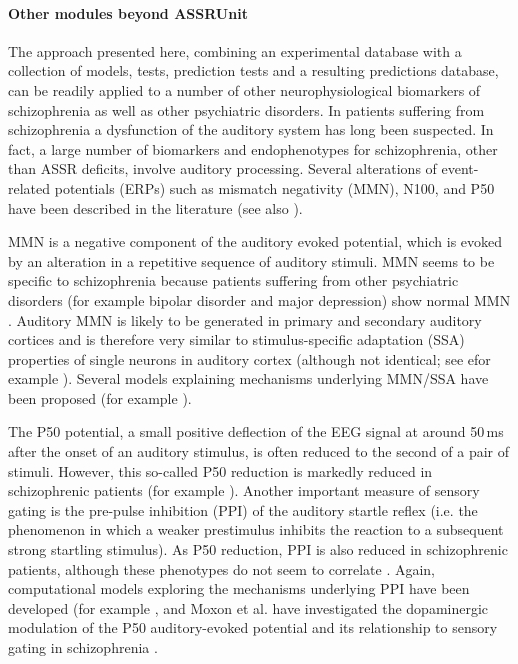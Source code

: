 \documentclass[a4paper,10pt]{article}
\begin{document}
\paragraph{Other modules beyond ASSRUnit}
The approach presented here, combining an experimental database with a collection of models, tests, prediction tests and a resulting predictions database, can be readily applied 
to a number of other neurophysiological biomarkers of schizophrenia as well as other psychiatric disorders. 
In patients suffering from schizophrenia a dysfunction of the auditory system has long been suspected. In fact, a large number of biomarkers and endophenotypes for schizophrenia, other
than ASSR deficits, involve auditory processing. Several alterations of event-related potentials (ERPs) such as mismatch negativity (MMN), N100, and P50 have been described in the literature 
(see also \cite{Siekmeier2015,Shi2007}).

MMN is a negative component of the auditory evoked potential, which is evoked by an alteration in a repetitive sequence of auditory stimuli. MMN
seems to be specific to schizophrenia because patients suffering from other psychiatric disorders (for example bipolar disorder and major depression) show normal MMN \cite{Umbricht2003}. 
Auditory MMN is likely to be generated in primary and secondary auditory cortices and is therefore very similar  
to stimulus-specific adaptation (SSA) properties of single neurons in auditory cortex \cite{Nelken2007} (although not identical; see efor example \cite{Farley2010,vonderBehrens2009}).
Several models explaining mechanisms underlying MMN/SSA have been proposed (for example \cite{Mill2011,Nelken2014}).  

The P50 potential, a small positive deflection of the EEG signal at around 50\,ms after the onset of an auditory stimulus, is often reduced to the second of a pair of stimuli.
However, this so-called P50 reduction is markedly reduced in schizophrenic patients (for example \cite{Braff2007}). Another important measure of sensory gating is the pre-pulse inhibition (PPI) of
the auditory startle reflex (i.e. the phenomenon in which a weaker prestimulus inhibits the reaction to a subsequent strong startling stimulus). As P50 reduction, PPI is also reduced in schizophrenic patients,
although these phenotypes do not seem to correlate \cite{Braff2007}. Again, computational models exploring the mechanisms underlying PPI have been developed (for example \cite{Schmajuk2005,Ramirez2012,Leumann2001}, and Moxon et al.
have investigated the dopaminergic modulation of the P50 auditory-evoked potential and its relationship to sensory gating in schizophrenia \cite{Moxon2003}.
 
\end{document}

